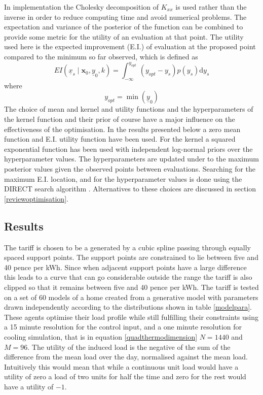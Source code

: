 \documentclass[a4paper, 10 pt, conference]{ieeeconf}  %
\begin{document}
In implementation the Cholesky decomposition of $K_{xx}$ is used rather than the inverse in order to reduce computing time and avoid numerical problems.
The expectation and variance of the posterior of the function can be combined to provide some metric for the utility of an evaluation at that point. The utility used here is the expected improvement (E.I.) of evaluation at the proposed point compared to the minimum so far observed, which is defined as
\begin{equation}
EI(\underline{x}_{s} \mid \mathbf{x}_0, \underline{y}_0, k)= \int_{-\infty  }^{y_{opt}} (y_{opt}-y_{s})p(y_{s}) \mathrm{d}y_{s}
\end{equation}
where
\begin{equation}
y_{opt} = \min(\underline{y}_{0})
\end{equation}
The choice of mean and kernel and utility functions and the hyperparameters of the kernel function and their prior of course have a major influence on the effectiveness of the optimisation. In the results presented below a zero mean function and E.I. utility function have been used. For the kernel a squared exponential function has been used with independent log-normal priors over the hyperparameter values. The hyperparameters are updated under to the maximum posterior values given the observed points between evaluations. Searching for the maximum E.I. location, and for the hyperparameter values is done using the DIRECT search algorithm \cite{jones1993lipschitzian}. Alternatives to these choices are discussed in section \ref{reviewoptimisation}.
\subsection{Results}
The tariff is chosen to be a generated by a cubic spline passing through equally spaced support points. The support points are constrained to lie between five and 40 pence per kWh. Since when adjacent support points have a large difference this leads to a curve that can go considerable outside the range the tariff is also clipped so that it remains between five and 40 pence per kWh. The tariff is tested on a set of 60 models of a home created from a generative model with parameters drawn independently according to the distributions shown in table \ref{modelpara}. These agents optimise their load profile while still fulfilling their constraints using a 15 minute resolution for the control input, and a one minute resolution for cooling simulation, that is in equation \ref{quadthermodimension} $N=1440$ and $M=96$. The utility of the induced load is the negative of the sum of the difference from the mean load over the day, normalised against the mean load. Intuitively this would mean that while a continuous unit load would have a utility of zero a load of two units for half the time and zero for the rest would have a utility of $-1$.
\end{document}
